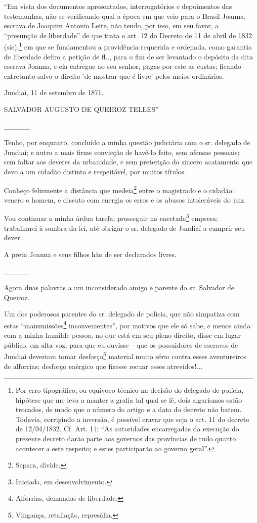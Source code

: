 {``Em vista dos documentos apresentados, interrogatórios e depoimentos das
testemunhas, não se verificando qual a época em que veio para o Brasil
Joanna, escrava de Joaquim Antonio Leite, não tendo, por isso, em seu
favor, a ``presunção de liberdade'' de que trata o art. 12 do Decreto de
11 de abril de 1832 (sic),\footnote{ Por erro tipográfico, ou equívoco
  técnico na decisão do delegado de polícia, hipótese que me leva a
  manter a grafia tal qual se lê, dois algarismos estão trocados, de
  modo que o número do artigo e a data do decreto não batem. Todavia,
  corrigindo a inversão, é possível cravar que seja o art. 11 do decreto
  de 12/04/1832. Cf. Art. 11: ``As autoridades encarregadas da execução
  do presente decreto darão parte aos governos das províncias de tudo
  quanto acontecer a este respeito; e estes participarão ao governo
  geral''.} em que se fundamentou a providência requerida e ordenada,
como garantia de liberdade defiro a petição de fl.., para o fim de ser
levantado o depósito da dita escrava Joanna, e ela entregue ao seu
senhor, pagas por este as custas; ficando entretanto salvo o direito 'de
mostrar que é livre' pelos meios ordinários.

Jundiaí, 11 de setembro de 1871.

SALVADOR AUGUSTO DE QUEIROZ TELLES''

\_\_\_\_\_

Tenho, por enquanto, concluído a minha questão judiciária com o sr.
delegado de Jundiaí; e nutro a mais firme convicção de havê-lo feito,
sem ofensas pessoais; sem faltar aos deveres da urbanidade, e sem
preterição do sincero acatamento que devo a um cidadão distinto e
respeitável, por muitos títulos.

Conheço felizmente a distância que medeia\footnote{ Separa, divide.}
entre o magistrado e o cidadão: venero o homem, e discuto com energia os
erros e os abusos intoleráveis do juiz.

Vou continuar a minha árdua tarefa; prosseguir na encetada\footnote{
  Iniciada, em desenvolvimento.} empresa; trabalharei à sombra da lei,
até obrigar o sr. delegado de Jundiaí a cumprir seu dever.

A preta Joanna e seus filhos hão de ser declarados livres.

\_\_\_\_\_

Agora duas palavras a um inconsiderado amigo e parente do sr. Salvador
de Queiroz.

Um dos poderosos parentes do sr. delegado de polícia, que não simpatiza
com estas ``manumissões\footnote{ Alforrias, demandas de liberdade.}
inconvenientes'', por motivos que ele só sabe, e menos ainda com a minha
humilde pessoa, no que está em seu pleno direito, disse em lugar
público, em alta voz, para que eu ouvisse -- que os possuidores de
escravos de Jundiaí deveriam tomar desforço\footnote{ Vingança,
  retaliação, represália.} material muito sério contra esses
aventureiros de alforrias; desforço enérgico que fizesse recuar esses
atrevidos!...

}
